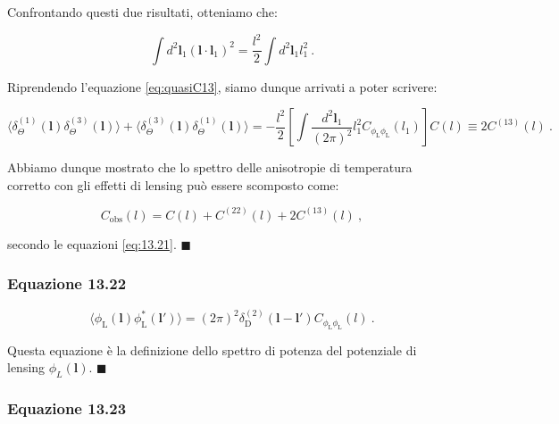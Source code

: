 \documentclass[a4paper,10pt]{article}
\newcommand{\B}{\boldsymbol}
\begin{document}
Confrontando questi due risultati, otteniamo che:

\begin{equation}
    	\int d^2 \B l_1 (\boldsymbol{l} \cdot \boldsymbol{l}_1)^2 = \frac{l^2}{2} \int d^2 \B l_1l_1^2 \ .
\end{equation}

Riprendendo l'equazione \eqref{eq:quasiC13}, siamo dunque arrivati a poter scrivere:

\begin{equation}
    \langle \delta_\Theta^{(1)}(\B l) \delta_\Theta^{(3)}(\B l) \rangle + \langle \delta_\Theta^{(3)}(\B l) \delta_\Theta^{(1)}(\B l) \rangle = -\frac{l^2}{2} \left[ \int \frac{d^2 \B l_1}{(2\pi)^2} l_1^2 C_{\phi_{\text{L}}\phi_{\text{L}}}(l_1) \right] C(l) \equiv 2C^{(13)}(l) \ .
\end{equation}

Abbiamo dunque mostrato che lo spettro delle anisotropie di temperatura corretto con gli effetti di lensing può essere scomposto come:

\begin{equation}
    C_{\text{obs}}(l) = C(l) + C^{(22)}(l) + 2C^{(13)}(l) \ ,
\end{equation}

secondo le equazioni \eqref{eq:13.21}. \hfill $\blacksquare$






\subsubsection*{Equazione 13.22}

\begin{equation} \label{eq:13.22}
\langle \phi_{\text{L}}(\boldsymbol{l}) \phi_{\text{L}}^*(\boldsymbol{l}') \rangle = (2\pi)^2 \delta_{\text{D}}^{(2)} (\boldsymbol{l} - \boldsymbol{l}') C_{\phi_{\text{L}}\phi_{\text{L}}}(l) \ .
\end{equation}

Questa equazione è la definizione dello spettro di potenza del potenziale di lensing $\phi_L(\B l)$. \hfill $\blacksquare$





\subsubsection*{Equazione 13.23}
\end{document}
